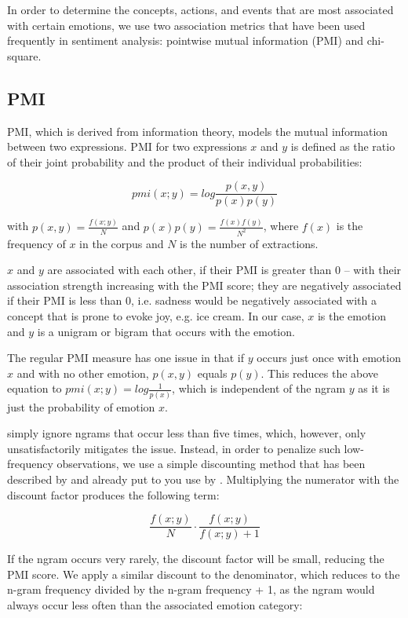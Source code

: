 In order to determine the concepts, actions, and events that are most associated with certain emotions, we use two association metrics that have been used frequently in sentiment analysis: pointwise mutual information (PMI) and chi-square.

\subsection{PMI}

PMI, which is derived from information theory, models the mutual information between two expressions. PMI for two expressions $x$ and $y$ is defined as the ratio of their joint probability and the product of their individual probabilities:

$$pmi(x;y) = log \dfrac{p(x,y)}{p(x)p(y)}$$

with $p(x,y) = \frac{f(x;y)}{N}$ and $p(x)p(y) = \frac{f(x)f(y)}{N^{2}}$, where $f(x)$ is the frequency of $x$ in the corpus and $N$ is the number of extractions.

$x$ and $y$ are associated with each other, if their PMI is greater than 0 -- with their association strength increasing with the PMI score; they are negatively associated if their PMI is less than 0, i.e. sadness would be negatively associated with a concept that is prone to evoke joy, e.g. ice cream.
In our case, $x$ is the emotion and $y$ is a unigram or bigram that occurs with the emotion.

The regular PMI measure has one issue in that if $y$ occurs just once with emotion $x$ and with no other emotion, $p(x,y)$ equals $p(y)$. This reduces the above equation to $pmi(x;y) = log \frac{1}{p(x)}$, which is independent of the ngram $y$ as it is just the probability of emotion $x$.

\citeauthor{twitter_hashtags_nrc} simply ignore ngrams that occur less than five times, which, however, only unsatisfactorily mitigates the issue. Instead, in order to penalize such low-frequency observations, we use a simple discounting method that has been described by \citeauthor{pmi_discount} and already put to you use by \citeauthor{matt_dissertation_pmi}. Multiplying the numerator with the discount factor produces the following term:

$$\frac{f(x;y)}{N} \cdot \frac{f(x;y)}{f(x;y) + 1}$$

If the ngram occurs very rarely, the discount factor will be small, reducing the PMI score. We apply a similar discount to the denominator, which reduces to the n-gram frequency divided by the n-gram frequency + 1, as the ngram would always occur less often than the associated emotion category:

